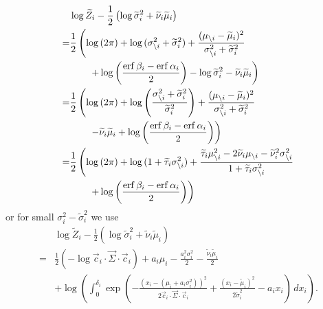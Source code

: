 \documentclass[11pt,twoside]{report}
\begin{document}
\begin{align}
  & \log{\widetilde{Z}_i}
  - \frac{1}{2}
  \left(
  \log{\widetilde{\sigma}_i^2}
  + \widetilde{\nu}_i \widetilde{\mu}_i
  \right)
  \nonumber \\ =&
  \frac{1}{2} \left(
  \log{(2\pi)} +
  \log{(\sigma_{\setminus i}^2 + \widetilde{\sigma}_i^2)} +
  \frac{(\mu_{\setminus i} - \widetilde{\mu}_i)^2}{\sigma_{\setminus i}^2 + \widetilde{\sigma}_i^2}
  \right.
  \nonumber \\ & \qquad
  \left.
  + \log{\left(\frac{\operatorname{erf}{\beta_i} - \operatorname{erf}{\alpha_i}}{2}\right)}
  - \log{\widetilde{\sigma}_i^2}
  - \widetilde{\nu}_i \widetilde{\mu}_i
  \right)
  \nonumber \\ =&
  \frac{1}{2} \left(
  \log{(2\pi)} +
  \log{\left(\frac{\sigma_{\setminus i}^2 + \widetilde{\sigma}_i^2}{\widetilde{\sigma}_i^2}\right)}
  + \frac{(\mu_{\setminus i} - \widetilde{\mu}_i)^2}{\sigma_{\setminus i}^2 + \widetilde{\sigma}_i^2}
  \right.
  \nonumber \\ & \qquad
  \left.
  - \widetilde{\nu}_i \widetilde{\mu}_i
  + \log{\left(\frac{\operatorname{erf}{\beta_i} - \operatorname{erf}{\alpha_i}}{2}\right)}
  \right)
  \nonumber \\ =&
  \frac{1}{2} \left(
  \log{(2\pi)} +
  \log{(1 + \widetilde{\tau}_i \sigma_{\setminus i}^2)}
  + \frac{\widetilde{\tau}_i \mu_{\setminus i}^2 - 2\widetilde{\nu}_i \mu_{\setminus i} - \widetilde{\nu}_i^2 \sigma_{\setminus i}^2}
  {1 + \widetilde{\tau}_i \sigma_{\setminus i}^2}
  \right.
  \nonumber \\ & \qquad
  \left.
  + \log{\left(\frac{\operatorname{erf}{\beta_i} - \operatorname{erf}{\alpha_i}}{2}\right)}
  \right)
\end{align}
or for small $\sigma_i^2 - \widetilde{\sigma}_i^2$ we use
\begin{equation}
  \begin{split}
    &
    \log{\widetilde{Z}_i}
    - \frac{1}{2}
    \left(
    \log{\widetilde{\sigma}_i^2}
    + \widetilde{\nu}_i \widetilde{\mu}_i
    \right)
    \\ =&
    \frac{1}{2} \left( -\log{\vec{c}_i \cdot \vec{\Sigma} \cdot \vec{c}_i} \right)
    + a_i \mu_i
    - \frac{a_i^2 \sigma_i^2}{2}
    - \frac{\widetilde{\nu}_i \widetilde{\mu}_i}{2}
    \\ & + 
    \log{\left(
      \int_0^{\delta_i}
      \exp{\left( -\frac{(x_i - (\mu_i + a_i \sigma_i^2))^2}{2 \vec{c}_i \cdot \vec{\Sigma} \cdot \vec{c}_i} +
        \frac{(x_i - \widetilde{\mu}_i)^2}{2 \widetilde{\sigma}_i^2} -a_i x_i \right)} \, dx_i
      \right)}.
  \end{split}
\end{equation}
\end{document}
